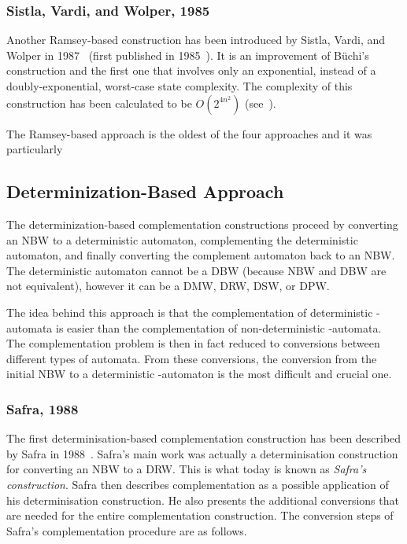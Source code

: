 \subsubsection{Sistla, Vardi, and Wolper, 1985}

Another Ramsey-based construction has been introduced by Sistla, Vardi, and Wolper in 1987~\cite{PrasadSistla1987217} (first published in 1985~\cite{1985_sistla}). It is an improvement of Büchi's construction and the first one that involves only an exponential, instead of a doubly-exponential, worst-case state complexity. The complexity of this construction has been calculated to be $O\left(2^{4n^2}\right)$ (see~\cite{1988_safra_2}\cite{Pecuchet198695}).

The Ramsey-based approach is the oldest of the four approaches and it was particularly 


\subsection{Determinization-Based Approach}
\label{2_determinisation-based}
The determinization-based complementation constructions proceed by converting an NBW to a deterministic automaton, complementing the deterministic automaton, and finally converting the complement automaton back to an NBW. The deterministic automaton cannot be a DBW (because NBW and DBW are not equivalent), however it can be a DMW, DRW, DSW, or DPW.

The idea behind this approach is that the complementation of deterministic \om-automata is easier than the complementation of non-deterministic \om-automata. The complementation problem is then in fact reduced to conversions between different types of automata. From these conversions, the conversion from the initial NBW to a deterministic \om-automaton is the most difficult and crucial one.

\subsubsection{Safra, 1988}

The first determinisation-based complementation construction has been described by Safra in 1988~\cite{1988_safra_2}. Safra's main work was actually a determinisation construction for converting an NBW to a DRW. This is what today is known as \textit{Safra's construction}. Safra then describes complementation as a possible application of his determinisation construction. He also presents the additional conversions that are needed for the entire complementation construction. The conversion steps of Safra's complementation procedure are as follows.


